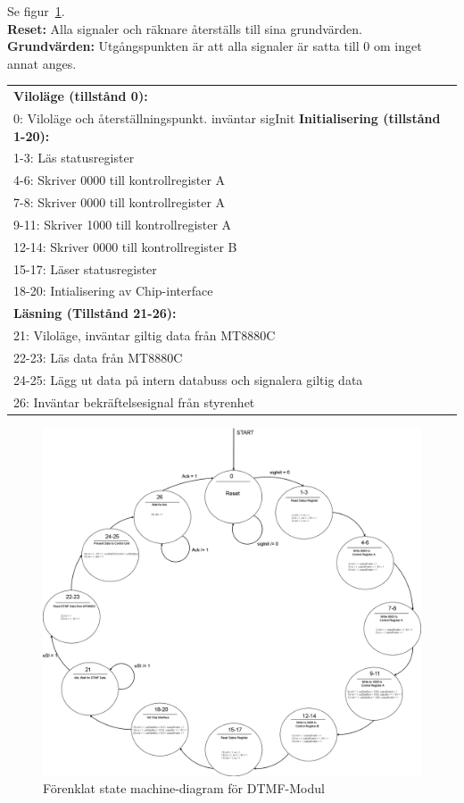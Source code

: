 \documentclass[a4paper,11pt]{article}
\begin{document}
			Se figur~\ref{fig:DTMFSM}.\\
			{\bf Reset:} Alla signaler och räknare återställs till sina grundvärden.\\
			{\bf Grundvärden:} Utgångspunkten är att alla signaler är satta till 0 om inget annat anges.\\
			\begin{tabular}{l}
				\\{\bf Viloläge (tillstånd 0):}\\
				0: Viloläge och återställningspunkt. inväntar sigInit
				{\bf Initialisering (tillstånd 1-20):}\\
				1-3: Läs statusregister\\
				4-6: Skriver 0000 till kontrollregister A\\
				7-8: Skriver 0000 till kontrollregister A\\
				9-11: Skriver 1000 till kontrollregister A\\
				12-14: Skriver 0000 till kontrollregister B\\
				15-17: Läser statusregister\\
				18-20: Intialisering av Chip-interface\\
				{\bf Läsning (Tillstånd 21-26):}\\
				21:  Viloläge, inväntar giltig data från MT8880C\\
				22-23:  Läs data från MT8880C\\
				24-25:  Lägg ut data på intern databuss och signalera giltig data\\
				26:  Inväntar bekräftelsesignal från styrenhet\\				
			\end{tabular}

	\begin{figure}[ht!tb]
	  \centering
	      \includegraphics[scale=0.18, angle=0]{DTMFStateMachineDiagram.png}		
	  	\caption{Förenklat state machine-diagram för DTMF-Modul}
		\label{fig:DTMFSM}
	\end{figure}
\end{document}
